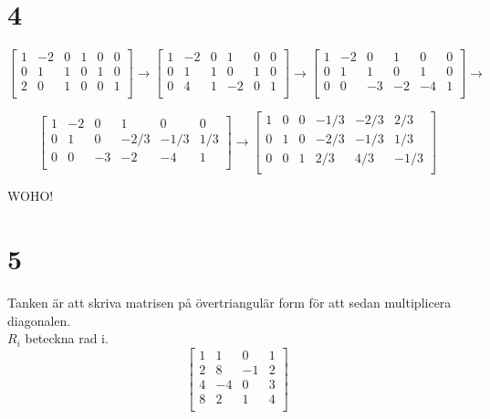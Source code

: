 \documentclass{article}
\begin{document}
\section*{4}
$$
\begin{bmatrix}
    1 & -2 & 0 & 1 & 0 & 0\\
    0 &  1 & 1 & 0 & 1 & 0\\
    2 &  0 & 1 & 0 & 0 & 1\\
\end{bmatrix}
\rightarrow
\begin{bmatrix}
    1 & -2 & 0 & 1 & 0 & 0\\
    0 &  1 & 1 & 0 & 1 & 0\\
    0 &  4 & 1 & -2 & 0 & 1\\
\end{bmatrix}
\rightarrow
\begin{bmatrix}
    1 & -2 & 0 & 1 & 0 & 0\\
    0 &  1 & 1 & 0 & 1 & 0\\
    0 &  0 & -3 & -2 & -4 & 1\\
\end{bmatrix}
\rightarrow
$$

$$
\begin{bmatrix}
    1 & -2 & 0 & 1 & 0 & 0\\ 
    0 &  1 & 0 & -2/3 & -1/3 & 1/3\\
    0 &  0 & -3 & -2 & -4 & 1\\
\end{bmatrix}
\rightarrow
\begin{bmatrix}
    1 &  0 & 0 & -1/3 & -2/3 & 2/3 \\
    0 &  1 & 0 & -2/3 & -1/3 & 1/3\\
    0 &  0 & 1 &  2/3 & 4/3  & -1/3\\
\end{bmatrix}$$

WOHO!

\section*{5}
Tanken är att skriva matrisen på övertriangulär form för att sedan multiplicera diagonalen.
\\
$R_i$ beteckna rad i.\\

$$
\begin{bmatrix}
    1  & 1   &  0   &  1 \\
    2  & 8   &  -1  &  2  \\
    4  & -4  &  0   &  3   \\
    8  &  2  &  1   &  4   \\
\end{bmatrix}
$$
\end{document}
